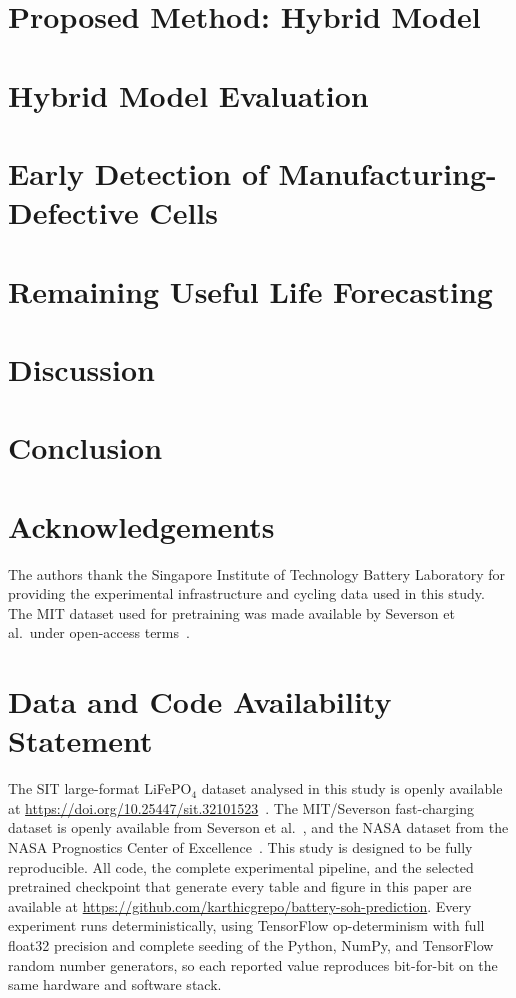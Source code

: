 \documentclass[a4paper,fleqn]{cas-dc}
\begin{document}
\section{Proposed Method: Hybrid Model}\label{sec:method}


\section{Hybrid Model Evaluation}\label{sec:results}


\section{Early Detection of Manufacturing-Defective Cells}\label{sec:screening}


\section{Remaining Useful Life Forecasting}\label{sec:rul}


\section{Discussion}\label{sec:discussion}


\section{Conclusion}\label{sec:conclusion}


\section*{Acknowledgements}
The authors thank the Singapore Institute of Technology Battery Laboratory
for providing the experimental infrastructure and cycling data used in this study.
The MIT dataset used for pretraining was made available by Severson et al.\
under open-access terms~\cite{severson2019data}.

\section*{Data and Code Availability Statement}
The SIT large-format LiFePO$_4$ dataset analysed in this study is openly
available at \url{https://doi.org/10.25447/sit.32101523}~\cite{ponnambalam2026sitdata}.
The MIT/Severson fast-charging dataset is openly available from Severson et
al.~\cite{severson2019data}, and the NASA dataset from the NASA Prognostics
Center of Excellence~\cite{saha2007battery}.
This study is designed to be fully reproducible. All code, the complete
experimental pipeline, and the selected pretrained checkpoint that generate every
table and figure in this paper are available at
\url{https://github.com/karthicgrepo/battery-soh-prediction}.
Every experiment runs deterministically, using TensorFlow op-determinism with full
float32 precision and complete seeding of the Python, NumPy, and TensorFlow random
number generators, so each reported value reproduces bit-for-bit on the same
hardware and software stack.
\end{document}
